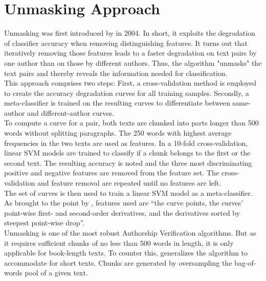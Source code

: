 \section{Unmasking Approach}\label{sec:unmasking-approach}
Unmasking was first introduced by \citeauthor{koppel2004unmasking} in 2004.
In short, it exploits the degradation of classifier accuracy when removing distinguishing features.
It turns out that iteratively removing those features leads to a faster degradation on text pairs by one author than on those by different authors.
Thus, the algorithm "unmasks" the text pairs and thereby reveals the information needed for classification.\\
This approach comprises two steps: First, a cross-validation method is employed to create the accuracy degradation curves for all training samples.
Secondly, a meta-classifier is trained on the resulting curves to differentiate between same-author and different-author curves.\\
To compute a curve for a pair, both texts are chunked into parts longer than 500 words without splitting paragraphs.
The 250 words with highest average frequencies in the two texts are used as features.
In a 10-fold cross-validation, linear SVM models are trained to classify if a chunk belongs to the first or the second text.
The resulting accuracy is noted and the three most discriminating positive and negative features are removed from the feature set.
The cross-validation and feature removal are repeated until no features are left.\\
The set of curves is then used to train a linear SVM model as a meta-classifier.
As brought to the point by \cite{bevendorff2019unmaskingShortTexts}, features used are ``the curve points, the curves' point-wise first- and second-order derivatives, and the derivatives sorted by steepest point-wise drop''.\\
Unmasking is one of the most robust Authorship Verification algorithms.
But as it requires sufficient chunks of no less than 500 words in length, it is only applicable for book-length texts.
To counter this, \cite{bevendorff2019unmaskingShortTexts} generalizes the algorithm to accommodate for short texts.
Chunks are generated by oversampling the bag-of-words pool of a given text.
